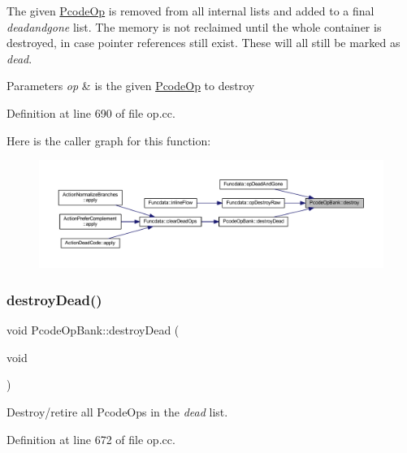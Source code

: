 The given \mbox{\hyperlink{class_pcode_op}{Pcode\+Op}} is removed from all internal lists and added to a final {\itshape deadandgone} list. The memory is not reclaimed until the whole container is destroyed, in case pointer references still exist. These will all still be marked as {\itshape dead}. 
\begin{DoxyParams}{Parameters}
{\em op} & is the given \mbox{\hyperlink{class_pcode_op}{Pcode\+Op}} to destroy \\
\hline
\end{DoxyParams}


Definition at line 690 of file op.\+cc.

Here is the caller graph for this function\+:
\nopagebreak
\begin{figure}[H]
\begin{center}
\leavevmode
\includegraphics[width=350pt]{class_pcode_op_bank_a1d447e7dcaeab2fd89e0a3dd8454b77d_icgraph}
\end{center}
\end{figure}
\mbox{\label{class_pcode_op_bank_aafab3087c0f8176d83088c66bc56f6b0}} 
\subsubsection{\texorpdfstring{destroyDead()}{destroyDead()}}
{\footnotesize\ttfamily void Pcode\+Op\+Bank\+::destroy\+Dead (\begin{DoxyParamCaption}\item[{void}]{ }\end{DoxyParamCaption})}



Destroy/retire all Pcode\+Ops in the {\itshape dead} list. 



Definition at line 672 of file op.\+cc.

